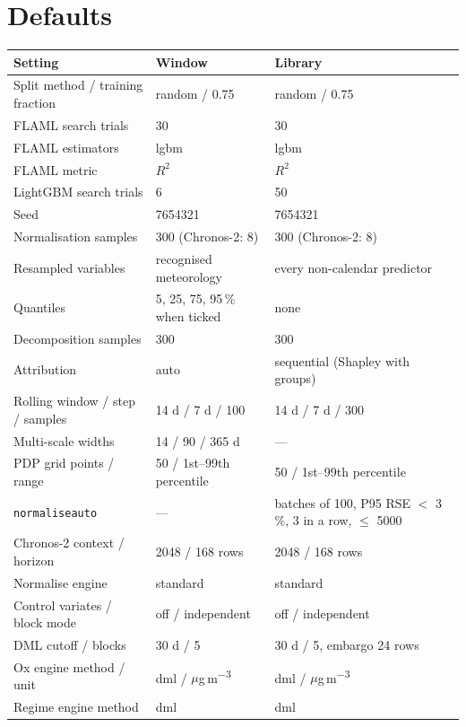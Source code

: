 \documentclass[11pt]{report}
\newcommand{\codeunderscore}{\textunderscore\allowbreak}
\newcommand{\code}[1]{\texttt{\let\_\codeunderscore #1}}
\newcommand{\ugm}{\ensuremath{\mu}g\,m\textsuperscript{$-3$}}
\begin{document}
\chapter{Defaults}\label{app:defaults}
\begin{center}\small
\begin{longtable}{@{}p{4.9cm}p{4.3cm}p{5.8cm}@{}}
\toprule
Setting & Window & Library \\
\midrule
\endhead
Split method / training fraction & random / 0.75 & random / 0.75 \\
FLAML search trials            & 30 & 30 \\
FLAML estimators               & lgbm & lgbm \\
FLAML metric                   & $R^2$ & $R^2$ \\
LightGBM search trials         & 6 & 50 \\
Seed                           & 7654321 & 7654321 \\
Normalisation samples          & 300 (Chronos-2: 8) & 300 (Chronos-2: 8) \\
Resampled variables            & recognised meteorology & every non-calendar predictor \\
Quantiles                      & 5, 25, 75, 95\,\% when ticked & none \\
Decomposition samples          & 300 & 300 \\
Attribution                    & auto & sequential (Shapley with groups) \\
Rolling window / step / samples & 14 d / 7 d / 100 & 14 d / 7 d / 300 \\
Multi-scale widths             & 14 / 90 / 365 d & --- \\
PDP grid points / range        & 50 / 1st--99th percentile & 50 / 1st--99th percentile \\
\code{normalise\_auto}          & --- & batches of 100, P95 RSE $<$ 3\,\%, 3 in a row, $\le$ 5000 \\
Chronos-2 context / horizon    & 2048 / 168 rows & 2048 / 168 rows \\
Normalise engine               & standard & standard \\
Control variates / block mode  & off / independent & off / independent \\
DML cutoff / blocks           & 30 d / 5 & 30 d / 5, embargo 24 rows \\
Ox engine method / unit        & dml / \ugm{} & dml / \ugm{} \\
Regime engine method           & dml & dml \\

\end{longtable}
\end{center}
\end{document}
